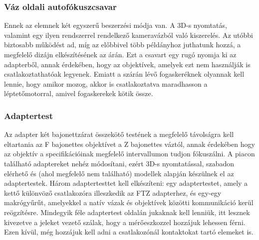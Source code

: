 \subsubsection{Váz oldali autofókuszcsavar}
Ennek az elemnek két egyszerű beszerzési módja van. A 3D-s nyomtatás, valamint egy ilyen rendszerrel rendelkező kameravázból való kiszerelés. Az utóbbi biztosabb működést ad, míg az előbbivel több példányhoz juthatunk hozzá, a megfelelő dizájn elkészítésének az árán. Ezt  a csavart egy rugó nyomja ki az adapterből, annak érdekében, hogy az objektívek, amelyek ezt nem használják is csatlakoztathatóak legyenek. Emiatt a szárán lévő fogaskeréknek olyannak kell lennie, hogy amikor mozog, akkor is csatlakoztatva maradhasson a léptetőmotorral, amivel fogaskerekek kötik össze.

\subsubsection{Adaptertest}
Az adapter két bajonettzárat összekötő testének a megfelelő távolságra kell eltartania az F bajonettes objektívet a Z bajonettes váztól, annak érdekében hogy az objektív a specifikációinak megfelelő intervallumon tudjon fókuszálni. A piacon található adaptereket nehéz módosítani, ezért 3D-s nyomtatással, szabadon elérhető és (ahol megfelelő nem található) modellek alapján készülnek el az adaptertestek. Három adaptertesttet kell elkészíteni: egy adaptertestet, amely a kettő különvöző csatlakozóra illeszkedik az FTZ adapterhez, és egy-egy makrógyűrűt, amelyekkel a natív vázak és objektívek közötti kommunikáció kerül reögzítésre. Mindegyik féle adaptertest oldalán jukaknak kell lenniük, itt lesznek kivezetve a jeleket vezető szálak, hogy a mérőeszkozzel hozzájuk lehessen férni. Ezen kívül, még hozzájuk kell adni a csatlakozónál kontaktokat tartó elemeket is.